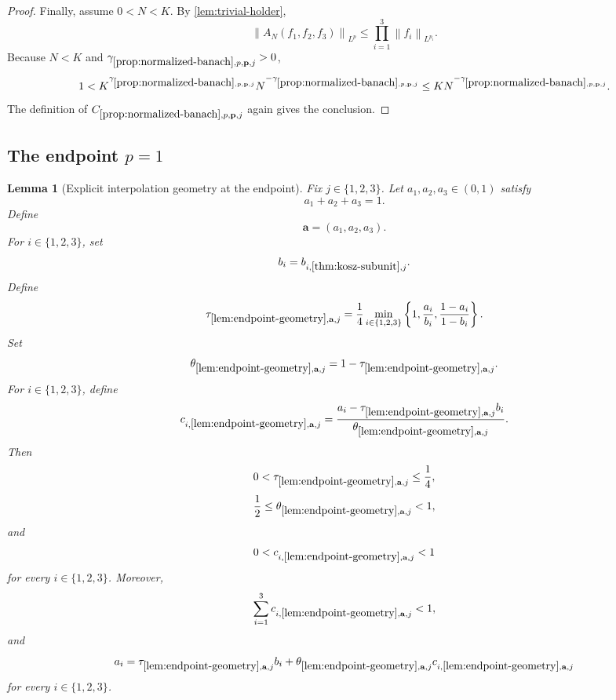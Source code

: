 \documentclass[11pt]{article}
\newtheorem{lemma}[theorem]{Lemma}
\newcommand{\norm}[2]{\left\lVert #1\right\rVert_{#2}}
\newcommand{\Cst}[2]{C_{\ref{#1},#2}}
\newcommand{\Gam}[2]{\gamma_{\ref{#1},#2}}
\newcommand{\set}[1]{\left\{#1\right\}}
\newcommand{\indices}{\{1,2,3\}}
\begin{document}
\begin{proof}
		Finally, assume \(0<N<K\).  By \cref{lem:trivial-holder},
		\[
		\norm{A_N(f_1,f_2,f_3)}{L^p}
		\leq
		\prod_{i=1}^{3}\norm{f_i}{L^{p_i}}.
		\]
		Because \(N<K\) and \(\Gam{prop:normalized-banach}{p,\mathbf p,j}>0\),
		\[
		1<K^{\Gam{prop:normalized-banach}{p,\mathbf p,j}}
		N^{-\Gam{prop:normalized-banach}{p,\mathbf p,j}}
		\leq
		K N^{-\Gam{prop:normalized-banach}{p,\mathbf p,j}}.
		\]
		The definition of \(\Cst{prop:normalized-banach}{p,\mathbf p,j}\) again gives the conclusion.
	\end{proof}
	
	\subsection{The endpoint \(p=1\)}
	
	\begin{lemma}[Explicit interpolation geometry at the endpoint]\label{lem:endpoint-geometry}
		Fix \(j\in\indices\).  Let \(a_1,a_2,a_3\in(0,1)\) satisfy
		\[
		a_1+a_2+a_3=1.
		\]
		Define
		\[
		\mathbf a=(a_1,a_2,a_3).
		\]
		For \(i\in\indices\), set
		\[
		b_i=b_{i,\ref{thm:kosz-subunit},j}.
		\]
		Define
		\[
		\tau_{\ref{lem:endpoint-geometry},\mathbf a,j}
		=
		\frac14
		\min_{i\in\indices}
		\set{
			1,
			\frac{a_i}{b_i},
			\frac{1-a_i}{1-b_i}
		}.
		\]
		Set
		\[
		\theta_{\ref{lem:endpoint-geometry},\mathbf a,j}
		=1-\tau_{\ref{lem:endpoint-geometry},\mathbf a,j}.
		\]
		For \(i\in\indices\), define
		\[
		c_{i,\ref{lem:endpoint-geometry},\mathbf a,j}
		=
		\frac{a_i-\tau_{\ref{lem:endpoint-geometry},\mathbf a,j}b_i}
		{\theta_{\ref{lem:endpoint-geometry},\mathbf a,j}}.
		\]
		Then
		\[
		0<\tau_{\ref{lem:endpoint-geometry},\mathbf a,j}\leq\frac14,
		\]
		\[
		\frac12\leq\theta_{\ref{lem:endpoint-geometry},\mathbf a,j}<1,
		\]
		and
		\[
		0<c_{i,\ref{lem:endpoint-geometry},\mathbf a,j}<1
		\]
		for every \(i\in\indices\).  Moreover,
		\[
		\sum_{i=1}^{3}c_{i,\ref{lem:endpoint-geometry},\mathbf a,j}<1,
		\]
		and
		\[
		a_i
		=
		\tau_{\ref{lem:endpoint-geometry},\mathbf a,j}b_i
		+
		\theta_{\ref{lem:endpoint-geometry},\mathbf a,j}
		c_{i,\ref{lem:endpoint-geometry},\mathbf a,j}
		\]
		for every \(i\in\indices\).
	\end{lemma}
	
\end{document}
